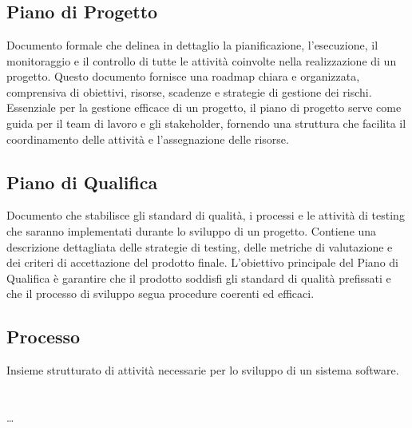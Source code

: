 
\section{}

\subsection*{Piano di Progetto}
Documento formale che delinea in dettaglio la pianificazione, l’esecuzione, il monitoraggio e il controllo di tutte le attività coinvolte nella 
realizzazione di un progetto. Questo documento fornisce una roadmap chiara e organizzata, comprensiva di obiettivi, risorse, scadenze e strategie di 
gestione dei rischi. Essenziale per la gestione efficace di un progetto, il piano di progetto serve come guida per il team di lavoro e gli stakeholder, 
fornendo una struttura che facilita il coordinamento delle attività e l’assegnazione delle risorse.

\subsection*{Piano di Qualifica}
Documento che stabilisce gli standard di qualità, i processi e le attività di testing che saranno implementati durante lo sviluppo di un progetto. 
Contiene una descrizione dettagliata delle strategie di testing, delle metriche di valutazione e dei criteri di accettazione del prodotto finale. 
L’obiettivo principale del Piano di Qualifica è garantire che il prodotto soddisfi gli standard di qualità prefissati e che il processo di sviluppo 
segua procedure coerenti ed efficaci.

\hypertarget{sec:processo}{}
\subsection*{Processo}
Insieme strutturato di attività necessarie per lo sviluppo di un sistema software.

\newpage



\section{}

\dots

\newpage



